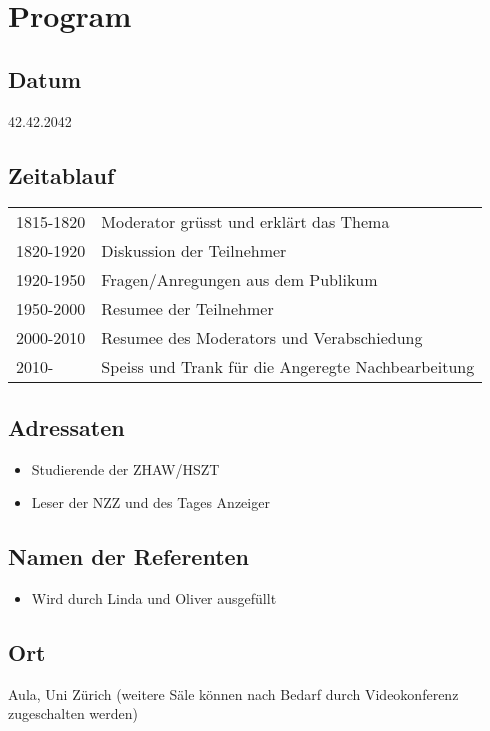 \section{Program}
\subsection{Datum}
42.42.2042

\subsection{Zeitablauf}
\begin{tabular}{ll}
1815-1820 & Moderator grüsst und erklärt das Thema\\
1820-1920 & Diskussion der Teilnehmer\\
1920-1950 & Fragen/Anregungen aus dem Publikum\\
1950-2000 & Resumee der Teilnehmer\\
2000-2010 & Resumee des Moderators und Verabschiedung\\
2010-         & Speiss und Trank für die Angeregte Nachbearbeitung\\
\end{tabular}

\subsection{Adressaten}
\begin{itemize}
 \item Studierende der ZHAW/HSZT
 \item Leser der NZZ und des Tages Anzeiger
\end{itemize}


\subsection{Namen der Referenten}
\begin{itemize}
 \item Wird durch Linda und Oliver ausgefüllt
\end{itemize}

\subsection{Ort}
Aula, Uni Zürich (weitere Säle können nach Bedarf durch Videokonferenz zugeschalten werden)

